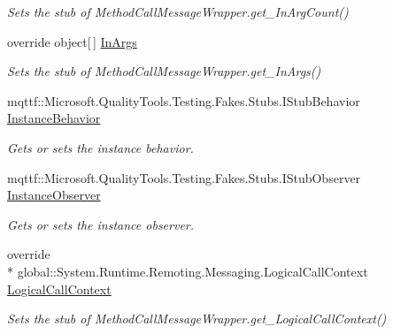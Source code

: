 \begin{DoxyCompactItemize}
\begin{DoxyCompactList}\small\item\em Sets the stub of Method\-Call\-Message\-Wrapper.\-get\-\_\-\-In\-Arg\-Count()\end{DoxyCompactList}\item 
override object\mbox{[}$\,$\mbox{]} \hyperlink{class_system_1_1_runtime_1_1_remoting_1_1_messaging_1_1_fakes_1_1_stub_method_call_message_wrapper_a66ec70e54edd2786d684247dcad53e78}{In\-Args}
\begin{DoxyCompactList}\small\item\em Sets the stub of Method\-Call\-Message\-Wrapper.\-get\-\_\-\-In\-Args()\end{DoxyCompactList}\item 
mqttf\-::\-Microsoft.\-Quality\-Tools.\-Testing.\-Fakes.\-Stubs.\-I\-Stub\-Behavior \hyperlink{class_system_1_1_runtime_1_1_remoting_1_1_messaging_1_1_fakes_1_1_stub_method_call_message_wrapper_a9246912c730298515b6bb357a13f8b83}{Instance\-Behavior}
\begin{DoxyCompactList}\small\item\em Gets or sets the instance behavior.\end{DoxyCompactList}\item 
mqttf\-::\-Microsoft.\-Quality\-Tools.\-Testing.\-Fakes.\-Stubs.\-I\-Stub\-Observer \hyperlink{class_system_1_1_runtime_1_1_remoting_1_1_messaging_1_1_fakes_1_1_stub_method_call_message_wrapper_afe5c6cb8f474190bb6b9cf727bd317af}{Instance\-Observer}
\begin{DoxyCompactList}\small\item\em Gets or sets the instance observer.\end{DoxyCompactList}\item 
override \\*
global\-::\-System.\-Runtime.\-Remoting.\-Messaging.\-Logical\-Call\-Context \hyperlink{class_system_1_1_runtime_1_1_remoting_1_1_messaging_1_1_fakes_1_1_stub_method_call_message_wrapper_a330e7254a0a264cd6e606bd6f143e95f}{Logical\-Call\-Context}
\begin{DoxyCompactList}\small\item\em Sets the stub of Method\-Call\-Message\-Wrapper.\-get\-\_\-\-Logical\-Call\-Context()\end{DoxyCompactList}\item 

\end{DoxyCompactItemize}
